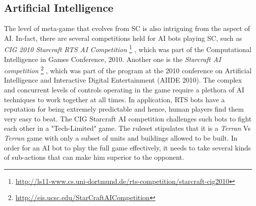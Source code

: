 \documentclass[conference]{IEEEtran}
\begin{document}
\subsection{Artificial Intelligence}
The level of meta-game that evolves from SC is also intriguing from the aspect of AI. In-fact, there are several competitions held for AI bots playing SC, such as \emph{CIG 2010 Starcraft RTS AI Competition}%
\footnote{\url{http://ls11-www.cs.uni-dortmund.de/rts-competition/starcraft-cig2010}}%
, which was part of the Computational Intelligence in Games Conference, 2010. Another one is the \emph{Starcraft AI competition}%
\footnote{\url{http://eis.ucsc.edu/StarCraftAICompetition}}%
, which was part of the program at the 2010 conference on Artificial Intelligence and Interactive Digital Entertainment (AIIDE 2010). The complex and concurrent levels of controls operating in the game require a plethora of AI techniques to work together at all times. In application, RTS bots have a reputation for being extremely predictable and hence, human players find them very easy to beat. The CIG Starcraft AI competition challenges such bots to fight each other in a "Tech-Limited" game. The ruleset stipulates that it is a \emph{Terran} Vs \emph{Terran} game with only a subset of units and buildings allowed to be built. In order for an AI bot to play the full game effectively, it needs to take several kinds of sub-actions that can make him superior to the opponent.

\end{document}
